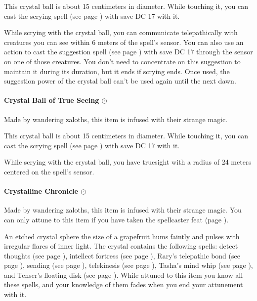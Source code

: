        This crystal ball is about 15 centimeters in diameter.
        While touching it, you can cast the scrying spell (see page \pageref{spell::scrying}) with save DC 17 with it.

        While scrying with the crystal ball, you can communicate telepathically with creatures you can see within 6 meters of the spell's sensor.
        You can also use an action to cast the suggestion spell (see page \pageref{spell::suggestion}) with save DC 17 through the sensor on one of those creatures.
        You don't need to concentrate on this suggestion to maintain it during its duration, but it ends if scrying ends.
        Once used, the suggestion power of the crystal ball can't be used again until the next dawn.
    \paragraph{Crystal Ball of True Seeing $\odot$}
        Made by wandering zaloths, this item is infused with their strange magic.

        This crystal ball is about 15 centimeters in diameter.
        While touching it, you can cast the scrying spell (see page \pageref{spell::scrying}) with save DC 17 with it.

        While scrying with the crystal ball, you have truesight with a radius of 24 meters centered on the spell's sensor.
    \paragraph{Crystalline Chronicle $\odot$}
        Made by wandering zaloths, this item is infused with their strange magic.
        You can only attune to this item if you have taken the spellcaster feat (page \pageref{feat::spellcaster}).

        An etched crystal sphere the size of a grapefruit hums faintly and pulses with irregular flares of inner light.
        The crystal contains the following spells: detect thoughts (see page \pageref{spell::detectthoughts}), intellect fortress (see page \pageref{spell::intellectfortress}), Rary's telepathic bond (see page \pageref{spell::rarystelepathicbond}), sending (see page \pageref{spell::sending}), telekinesis (see page \pageref{spell::telekinesis}), Tasha's mind whip (see page \pageref{spell::tashasmindwhip}), and Tenser's floating disk (see page \pageref{spell::tensersfloatingdisc}).
        While attuned to this item you know all these spells, and your knowledge of them fades when you end your attunement with it.

